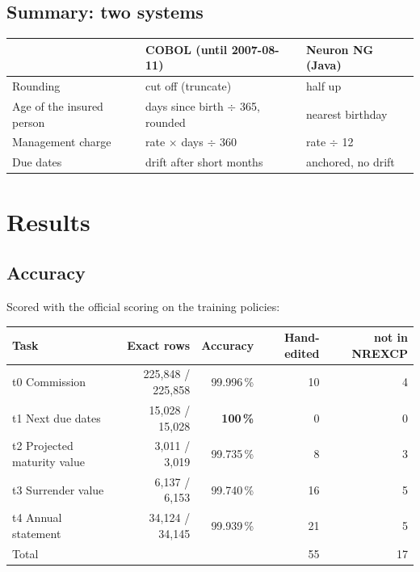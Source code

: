 \documentclass[11pt,a4paper]{article}
\begin{document}
\subsection{Summary: two systems}
\begin{center}
\begin{tabularx}{\textwidth}{@{}lLL@{}}
\toprule
 & COBOL (until 2007-08-11) & Neuron NG (Java) \\
\midrule
Rounding & cut off (truncate) & half up \\
Age of the insured person & days since birth $\div$ 365, rounded & nearest birthday \\
Management charge & rate $\times$ days $\div$ 360 & rate $\div$ 12 \\
Due dates & drift after short months & anchored, no drift \\
\bottomrule
\end{tabularx}
\end{center}

\section{Results}\label{sec:results}

\subsection{Accuracy}
Scored with the official scoring on the training policies:
\begin{center}
\begin{tabular}{@{}lrrrr@{}}
\toprule
Task & Exact rows & Accuracy & Hand-edited & not in NREXCP \\
\midrule
t0 Commission & 225,848 / 225,858 & 99.996\,\% & 10 & 4 \\
t1 Next due dates & 15,028 / 15,028 & {\color{exact}\bfseries 100\,\%} & 0 & 0 \\
t2 Projected maturity value & 3,011 / 3,019 & 99.735\,\% & 8 & 3 \\
t3 Surrender value & 6,137 / 6,153 & 99.740\,\% & 16 & 5 \\
t4 Annual statement & 34,124 / 34,145 & 99.939\,\% & 21 & 5 \\
\midrule
Total & & & 55 & 17 \\
\bottomrule
\end{tabular}
\end{center}
\end{document}
